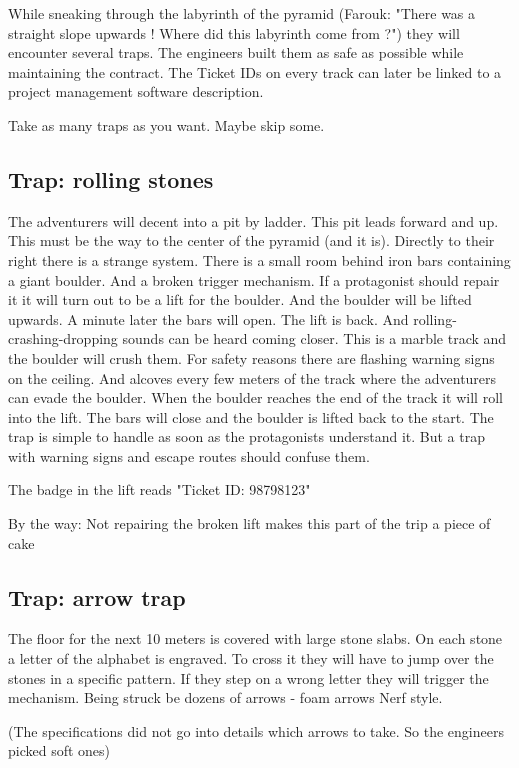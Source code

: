 While sneaking through the labyrinth of the pyramid (Farouk: "There was a straight slope upwards ! Where did this labyrinth come from ?") they will encounter several traps. The engineers built them as safe as possible while maintaining the contract. The Ticket IDs on every track can later be linked to a project management software description.

Take as many traps as you want. Maybe skip some.

\subsection{Trap: rolling stones}

The adventurers will decent into a pit by ladder. This pit leads forward and up. This must be the way to the center of the pyramid (and it is). Directly to their right there is a strange system. There is a small room behind iron bars containing a giant boulder. And a broken trigger mechanism. If a protagonist should repair it it will turn out to be a lift for the boulder. And the boulder will be lifted upwards.
A minute later the bars will open. The lift is back. And rolling-crashing-dropping sounds can be heard coming closer. This is a marble track and the boulder will crush them. For safety reasons there are flashing warning signs on the ceiling. And alcoves every few meters of the track where the adventurers can evade the boulder.
When the boulder reaches the end of the track it will roll into the lift. The bars will close and the boulder is lifted back to the start.
The trap is simple to handle as soon as the protagonists understand it. But a trap with warning signs and escape routes should confuse them.

The badge in the lift reads "Ticket ID: 98798123"

By the way: Not repairing the broken lift makes this part of the trip a piece of cake

\subsection{Trap: arrow trap}

The floor for the next 10 meters is covered with large stone slabs. On each stone a letter of the alphabet is engraved. To cross it they will have to jump over the stones in a specific pattern. If they step on a wrong letter they will trigger the mechanism. Being struck be dozens of arrows - foam arrows Nerf style.

(The specifications did not go into details which arrows to take. So the engineers picked soft ones)

